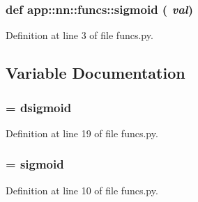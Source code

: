 \subsubsection{\setlength{\rightskip}{0pt plus 5cm}def app::nn::funcs::sigmoid ( {\em val})}\label{namespaceapp_1_1nn_1_1funcs_637bbf7f66fce5805072a7ec4ecaadd8}




Definition at line 3 of file funcs.py.

\subsection{Variable Documentation}
\subsubsection{ = dsigmoid\hspace{0.3cm}{\tt  [static]}}\label{namespaceapp_1_1nn_1_1funcs_829881eb3f749a3648a0841ca160bd99}




Definition at line 19 of file funcs.py.
\subsubsection{ = sigmoid\hspace{0.3cm}{\tt  [static]}}\label{namespaceapp_1_1nn_1_1funcs_3c8834e5554e467d1f54f9eaec1f8dd1}




Definition at line 10 of file funcs.py.